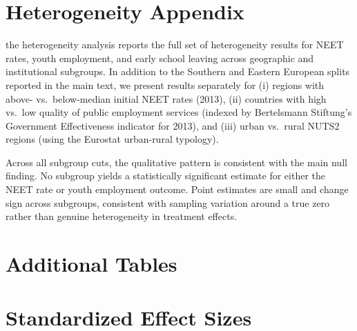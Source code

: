 \documentclass[12pt]{article}
\begin{document}
\section{Heterogeneity Appendix}
\label{sec:appD}

the heterogeneity analysis reports the full set of heterogeneity results for NEET rates, youth employment, and early school leaving across geographic and institutional subgroups. In addition to the Southern and Eastern European splits reported in the main text, we present results separately for (i) regions with above- vs.\ below-median initial NEET rates (2013), (ii) countries with high vs.\ low quality of public employment services (indexed by Bertelsmann Stiftung's Government Effectiveness indicator for 2013), and (iii) urban vs.\ rural NUTS2 regions (using the Eurostat urban-rural typology).


Across all subgroup cuts, the qualitative pattern is consistent with the main null finding. No subgroup yields a statistically significant estimate for either the NEET rate or youth employment outcome. Point estimates are small and change sign across subgroups, consistent with sampling variation around a true zero rather than genuine heterogeneity in treatment effects.

\section{Additional Tables}
\label{sec:appE}

\section{Standardized Effect Sizes}
\label{sec:sde}


\end{document}
